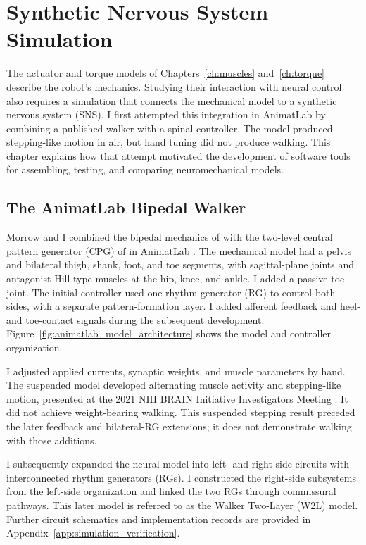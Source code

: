 \chapter{Synthetic Nervous System Simulation}\label{ch:sns}
\graphicspath{{figs/60-sns/}{figs/60-sns/AnimatLab_reference/}}

The actuator and torque models of Chapters~\ref{ch:muscles} and~\ref{ch:torque} describe the robot's mechanics. Studying their interaction with neural control also requires a simulation that connects the mechanical model to a synthetic nervous system (SNS). I first attempted this integration in AnimatLab by combining a published walker with a spinal controller. The model produced stepping-like motion in air, but hand tuning did not produce walking. This chapter explains how that attempt motivated the development of software tools for assembling, testing, and comparing neuromechanical models.

\section{The AnimatLab Bipedal Walker}\label{sec:prior_walker}

Morrow and I combined the bipedal mechanics of \citet{li_bipedal_2017} with the two-level central pattern generator (CPG) of \citet{deng_neuromechanical_2019} in AnimatLab \citep{cofer_animatlab_2010}. The mechanical model had a pelvis and bilateral thigh, shank, foot, and toe segments, with sagittal-plane joints and antagonist Hill-type muscles at the hip, knee, and ankle. I added a passive toe joint. The initial controller used one rhythm generator (RG) to control both sides, with a separate pattern-formation layer. I added afferent feedback and heel- and toe-contact signals during the subsequent development. Figure~\ref{fig:animatlab_model_architecture} shows the model and controller organization.

I adjusted applied currents, synaptic weights, and muscle parameters by hand. The suspended model developed alternating muscle activity and stepping-like motion, presented at the 2021 NIH BRAIN Initiative Investigators Meeting \citep{bolenTorqueValuesArtificialKnee2021June15-17}. It did not achieve weight-bearing walking. This suspended stepping result preceded the later feedback and bilateral-RG extensions; it does not demonstrate walking with those additions.

I subsequently expanded the neural model into left- and right-side circuits with interconnected rhythm generators (RGs). I constructed the right-side subsystems from the left-side organization and linked the two RGs through commissural pathways. This later model is referred to as the Walker Two-Layer (W2L) model. Further circuit schematics and implementation records are provided in Appendix~\ref{app:simulation_verification}.

